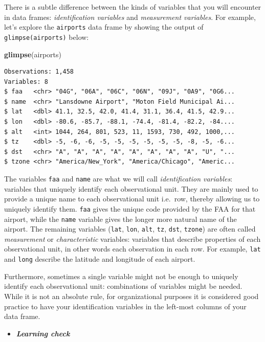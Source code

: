 \documentclass[12pt, krantz2,]{krantz}
\makeatletter
\newenvironment{Shaded}{\begin{snugshade}}{\end{snugshade}}
\newcommand{\KeywordTok}[1]{\textcolor[rgb]{0.27,0.27,0.27}{\textbf{#1}}}
\newcommand{\NormalTok}[1]{#1}
\newenvironment{kframe}{%
\medskip{}
\setlength{\fboxsep}{.8em}
 \def\at@end@of@kframe{}%
 \ifinner\ifhmode%
  \def\at@end@of@kframe{\end{minipage}}%
  \begin{minipage}{\columnwidth}%
 \fi\fi%
 \def\FrameCommand##1{\hskip\@totalleftmargin \hskip-\fboxsep
 \colorbox{shadecolor}{##1}\hskip-\fboxsep
     \hskip-\linewidth \hskip-\@totalleftmargin \hskip\columnwidth}%
 \MakeFramed {\advance\hsize-\width
   \@totalleftmargin\z@ \linewidth\hsize
   \@setminipage}}%
 {\par\unskip\endMakeFramed%
 \at@end@of@kframe}
\renewenvironment{Shaded}{\begin{kframe}}{\end{kframe}}
\newenvironment{rmdblock}[1]
  {\begin{shaded*}
  \begin{itemize}
  \renewcommand{\labelitemi}{
    \raisebox{-.7\height}[0pt][0pt]{
    }
  }
  \item
  }
  {
  \end{itemize}
  \end{shaded*}
  }
\newenvironment{learncheck}
  {\begin{rmdblock}{warning}}
  {\end{rmdblock}}
\makeatother
\begin{document}
There is a subtle difference between the kinds of variables that you will encounter in data frames: \emph{identification variables} and \emph{measurement variables}. For example, let's explore the \texttt{airports} data frame by showing the output of \texttt{glimpse(airports)} below:

\begin{Shaded}
\begin{Highlighting}[]
\KeywordTok{glimpse}\NormalTok{(airports)}
\end{Highlighting}
\end{Shaded}

\begin{verbatim}
Observations: 1,458
Variables: 8
$ faa   <chr> "04G", "06A", "06C", "06N", "09J", "0A9", "0G6...
$ name  <chr> "Lansdowne Airport", "Moton Field Municipal Ai...
$ lat   <dbl> 41.1, 32.5, 42.0, 41.4, 31.1, 36.4, 41.5, 42.9...
$ lon   <dbl> -80.6, -85.7, -88.1, -74.4, -81.4, -82.2, -84....
$ alt   <int> 1044, 264, 801, 523, 11, 1593, 730, 492, 1000,...
$ tz    <dbl> -5, -6, -6, -5, -5, -5, -5, -5, -5, -8, -5, -6...
$ dst   <chr> "A", "A", "A", "A", "A", "A", "A", "A", "U", "...
$ tzone <chr> "America/New_York", "America/Chicago", "Americ...
\end{verbatim}

The variables \texttt{faa} and \texttt{name} are what we will call \emph{identification variables}: variables that uniquely identify each observational unit. They are mainly used to provide a unique name to each observational unit i.e.~row, thereby allowing us to uniquely identify them. \texttt{faa} gives the unique code provided by the FAA for that airport, while the \texttt{name} variable gives the longer more natural name of the airport. The remaining variables (\texttt{lat}, \texttt{lon}, \texttt{alt}, \texttt{tz}, \texttt{dst}, \texttt{tzone}) are often called \emph{measurement} or \emph{characteristic} variables: variables that describe properties of each observational unit, in other words each observation in each row. For example, \texttt{lat} and \texttt{long} describe the latitude and longitude of each airport.

Furthermore, sometimes a single variable might not be enough to uniquely identify each observational unit: combinations of variables might be needed. While it is not an absolute rule, for organizational purposes it is considered good practice to have your identification variables in the left-most columns of your data frame.

\begin{learncheck}
\textbf{\emph{Learning check}}
\end{learncheck}
\end{document}
